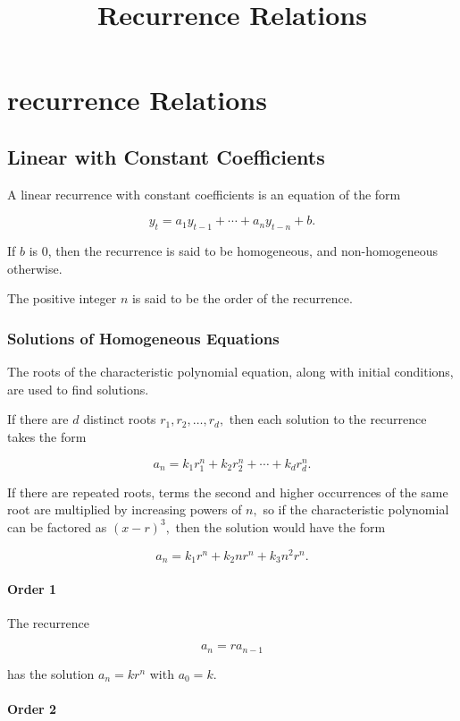 \documentclass{article}
\title{Recurrence Relations}
\begin{document}
\section{recurrence Relations}

\subsection{Linear with Constant Coefficients}

A linear recurrence with constant coefficients is an equation of the form

\[ y_t = a_1 y_{t - 1} + \cdots + a_n y_{t - n} + b. \]

If $b$ is 0, then the recurrence is said to be homogeneous, and non-homogeneous otherwise.

The positive integer $n$ is said to be the order of the recurrence.

\subsubsection{Solutions of Homogeneous Equations}

The roots of the characteristic polynomial equation, along with initial conditions, are used to find \@{solutions}.

If there are $d$ distinct roots $r_1, r_2, \dots, r_d,$ then each solution to the recurrence takes the form

\[ a_n = k_1 r_1^n + k_2 r_2^n + \cdots + k_d r_d^n. \]

If there are repeated roots, terms the second and higher occurrences of the same root are multiplied by increasing powers of $n,$ so if the characteristic polynomial can be factored as $(x - r)^3,$ then the solution would have the form

\[ a_n = k_1 r^n + k_2 n r^n + k_3 n^2 r^n. \]

\paragraph{Order 1}

The recurrence

\[ a_n = ra_{n-1} \]

has the solution $a_n = kr^n$ with $a_0 = k.$

\paragraph{Order 2}
\end{document}
